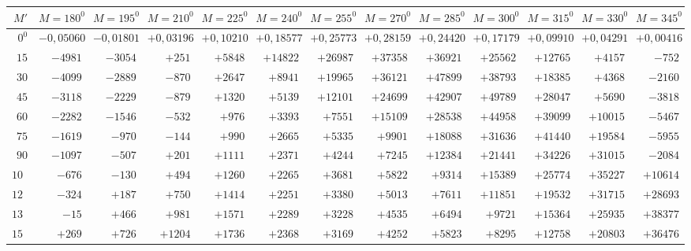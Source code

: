 \begin{landscape}
\begin{center}
\end{center}
\clearpage
\begin{center}
\begin{tabular}{@{}r|*{11}{r|}r@{}}
\hline
\(M'\) & \(M=180^0\) & \(M=195^0\) & \(M=210^0\) & \(M=225^0\) & \(M=240^0\) & \(M=255^0\) & \(M=270^0\) & \(M=285^0\) & \(M=300^0\) & \(M=315^0\) & \(M=330^0\) & \(M=345^0\)\\
\hline
\(0^0\) & \(-0{,}05060\) & \(-0{,}01801\) & \(+0{,}03196\) & \(+0{,}10210\) & \(+0{,}18577\) & \(+0{,}25773\) & \(+0{,}28159\) & \(+0{,}24420\) & \(+0{,}17179\) & \(+0{,}09910\) & \(+0{,}04291\) & \(+0{,}00416\)\\
\(15\) & \(-4981\) & \(-3054\) & \(+251\) & \(+5848\) & \(+14822\) & \(+26987\) & \(+37358\) & \(+36921\) & \(+25562\) & \(+12765\) & \(+4157\) & \(-752\)\\
\(30\) & \(-4099\) & \(-2889\) & \(-870\) & \(+2647\) & \(+8941\) & \(+19965\) & \(+36121\) & \(+47899\) & \(+38793\) & \(+18385\) & \(+4368\) & \(-2160\)\\
\(45\) & \(-3118\) & \(-2229\) & \(-879\) & \(+1320\) & \(+5139\) & \(+12101\) & \(+24699\) & \(+42907\) & \(+49789\) & \(+28047\) & \(+5690\) & \(-3818\)\\
\(60\) & \(-2282\) & \(-1546\) & \(-532\) & \(+976\) & \(+3393\) & \(+7551\) & \(+15109\) & \(+28538\) & \(+44958\) & \(+39099\) & \(+10015\) & \(-5467\)\\
\(75\) & \(-1619\) & \(-970\) & \(-144\) & \(+990\) & \(+2665\) & \(+5335\) & \(+9901\) & \(+18088\) & \(+31636\) & \(+41440\) & \(+19584\) & \(-5955\)\\
\(90\) & \(-1097\) & \(-507\) & \(+201\) & \(+1111\) & \(+2371\) & \(+4244\) & \(+7245\) & \(+12384\) & \(+21441\) & \(+34226\) & \(+31015\) & \(-2084\)\\
\(105\) & \(-676\) & \(-130\) & \(+494\) & \(+1260\) & \(+2265\) & \(+3681\) & \(+5822\) & \(+9314\) & \(+15389\) & \(+25774\) & \(+35227\) & \(+10614\)\\
\(120\) & \(-324\) & \(+187\) & \(+750\) & \(+1414\) & \(+2251\) & \(+3380\) & \(+5013\) & \(+7611\) & \(+11851\) & \(+19532\) & \(+31715\) & \(+28693\)\\
\(135\) & \(-15\) & \(+466\) & \(+981\) & \(+1571\) & \(+2289\) & \(+3228\) & \(+4535\) & \(+6494\) & \(+9721\) & \(+15364\) & \(+25935\) & \(+38377\)\\
\(150\) & \(+269\) & \(+726\) & \(+1204\) & \(+1736\) & \(+2368\) & \(+3169\) & \(+4252\) & \(+5823\) & \(+8295\) & \(+12758\) & \(+20803\) & \(+36476\)\\

\end{tabular}
\end{center}
\end{landscape}
